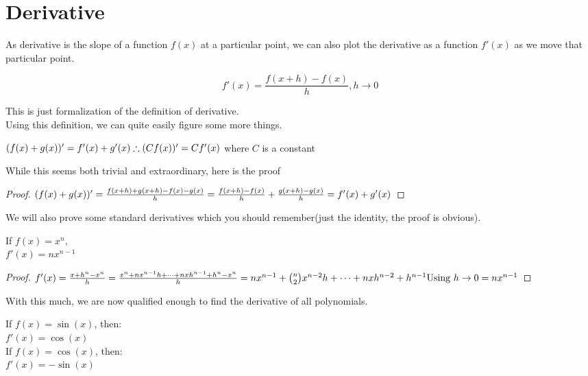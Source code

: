 \section{Derivative}
As derivative is the slope of a function $f(x)$ at a particular point, we can also plot the derivative as a function $f'(x)$ as we move that particular point.\\
\begin{theorem}
    \[f'(x)=\frac{f(x+h)-f(x)}{h}, h \rightarrow 0\] 
\end{theorem}
This is just formalization of the definition of derivative.\\
Using this definition, we can quite easily figure some more things.\\
\begin{theorem}
    $(f(x)+g(x))'=f'(x)+g'(x)\\
    \therefore (Cf(x))'=Cf'(x)$ where $C$ is a constant
\end{theorem}
While this seems both trivial and extraordinary, here is the proof
\begin{proof}
    $(f(x)+g(x))'\\
    =\frac{f(x+h)+g(x+h)-f(x)-g(x)}{h}\\
    = \frac{f(x+h)-f(x)}{h}+\frac{g(x+h)-g(x)}{h}\\
    = f'(x)+g'(x)$
\end{proof}
We will also prove some standard derivatives which you should remember(just the identity, the proof is obvious).
\begin{theorem}
    If $f(x)=x^n$,\\
    $f'(x)=nx^{n-1}$
\end{theorem}
\begin{proof}
    $f'(x)=\frac{{x+h}^n-x^n}{h}\\
    = \frac{x^n+nx^{n-1}h+\dots+nxh^{n-1}+h^n -x^n}{h}
    = nx^{n-1}+\binom{n}{2}x^{n-2}h+\dots +nxh^{n-2}+h^{n-1} \text{Using } h \rightarrow 0\\
    =nx^{n-1}$
\end{proof}
With this much, we are now qualified enough to find the derivative of all polynomials.
\begin{theorem}
    If $f(x)=\sin(x)$, then:\\
    $f'(x)=\cos(x)$\\
    If $f(x)=\cos(x)$, then:\\
    $f'(x)=-\sin(x)$
\end{theorem}
